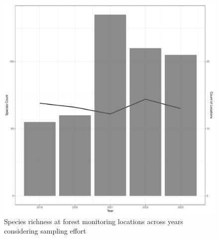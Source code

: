 \documentclass[
  letterpaper,
  DIV=11,
  numbers=noendperiod,
  oneside]{scrartcl}
\begin{document}
\begin{figure}

{\centering \includegraphics{peinp_files/figure-pdf/fig-spp-rich-annual-1.pdf}

}

\caption{\label{fig-spp-rich-annual}Species richness at forest
monitoring locations across years considering sampling effort}

\end{figure}
\end{document}
